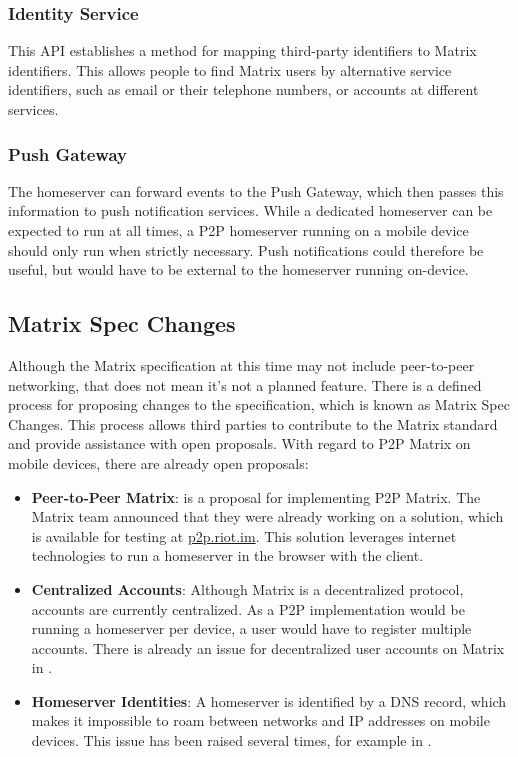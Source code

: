 \subsubsection{Identity Service}
This \ac{API} establishes a method for mapping third-party identifiers to Matrix identifiers.
This allows people to find Matrix users by alternative service identifiers, such as email or their telephone numbers, or accounts at different services.

\subsubsection{Push Gateway}
The homeserver can forward events to the Push Gateway, which then passes this information to push notification services.
While a dedicated homeserver can be expected to run at all times, a \ac{P2P} homeserver running on a mobile device should only run when strictly necessary.
Push notifications could therefore be useful, but would have to be external to the homeserver running on-device.


\subsection{Matrix Spec Changes}\label{subsec:matrix_spec_changes}
Although the Matrix specification at this time may not include peer-to-peer networking, that does not mean it's not a planned feature.
There is a defined process for proposing changes to the specification, which is known as Matrix Spec Changes\cite{matrix_org_spec_changes}.
This process allows third parties to contribute to the Matrix standard and provide assistance with open proposals.
With regard to \ac{P2P} Matrix on mobile devices, there are already open proposals:
\begin{itemize}
	\item{
	      \textbf{Peer-to-Peer Matrix}:
	       is a proposal for implementing \ac{P2P} Matrix.
	      The Matrix team announced that they were already working on a solution, which is available for testing at \url{p2p.riot.im}.
	      This solution leverages internet technologies to run a homeserver in the browser with the client.
	      }
	\item{
	      \textbf{Centralized Accounts}:
	      Although Matrix is a decentralized protocol, accounts are currently centralized.
	      As a \ac{P2P} implementation would be running a homeserver per device, a user would have to register multiple accounts.
	      There is already an issue for decentralized user accounts on Matrix in .
	      }
	\item{
	      \textbf{Homeserver Identities}:
	      A homeserver is identified by a DNS record, which makes it impossible to roam between networks and IP addresses on mobile devices.
	      This issue has been raised several times, for example in .
	      }
\end{itemize}

